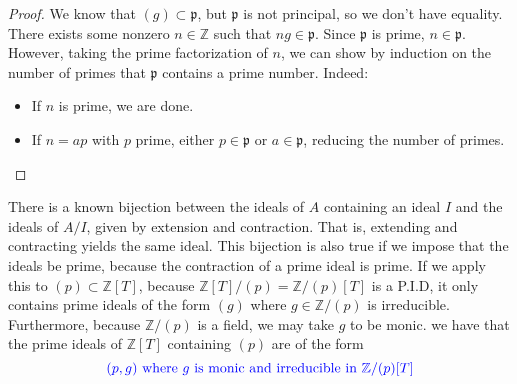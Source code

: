 \begin{problem}
\begin{sol}
\begin{enumerate}
\begin{claim}
\begin{proof}
                We know that $(g) \subset \mathfrak{p}$, but $\mathfrak{p}$ is not principal, so we don't have equality.
                There exists some nonzero $n \in \mathbb{Z}$ such that $ng \in \mathfrak{p}$.
                Since $\mathfrak{p}$ is prime, $n \in \mathfrak{p}$.
                However, taking the prime factorization of $n$, we can show by induction on the number of primes that $\mathfrak{p}$ contains a prime number.
                Indeed:
                \begin{itemize}
                    \item If $n$ is prime, we are done.
                    \item If $n = ap$ with $p$ prime, either $p \in \mathfrak{p}$ or $a \in \mathfrak{p}$, reducing the number of primes.
                \end{itemize}
            \end{proof}
        \end{claim}

        There is a known bijection between the ideals of $A$ containing an ideal $I$ and the ideals of $A/I$, given by extension and contraction.
        That is, extending and contracting yields the same ideal.
        This bijection is also true if we impose that the ideals be prime, because the contraction of a prime ideal is prime.
        If we apply this to $(p) \subset \mathbb{Z}[T]$,
        because $\mathbb{Z}[T]/(p) = \mathbb{Z}/(p)[T]$ is a P.I.D,
        it only contains prime ideals of the form $(g)$ where $g \in \mathbb{Z}/(p)$ is irreducible.
        Furthermore, because $\mathbb{Z}/(p)$ is a field, we may take $g$ to be monic.
        we have that the prime ideals of $\mathbb{Z}[T]$ containing $(p)$ are of the form
        \[
            \textcolor{blue}{(p, g) \text{ where } g \text{ is monic and irreducible in } \mathbb{Z}/(p)[T]}
        \]

    \end{enumerate}
\end{sol}
\end{problem}
